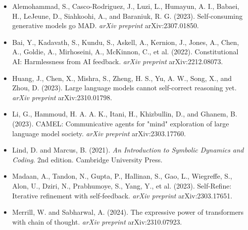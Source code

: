 \begin{itemize}
\item Alemohammad, S., Casco-Rodriguez, J., Luzi, L., Humayun, A. I., Babaei, H., LeJeune, D., Siahkoohi, A., and Baraniuk, R. G. (2023). Self-consuming generative models go MAD. \textit{arXiv preprint} arXiv:2307.01850.
\end{itemize}

\begin{itemize}
\item Bai, Y., Kadavath, S., Kundu, S., Askell, A., Kernion, J., Jones, A., Chen, A., Goldie, A., Mirhoseini, A., McKinnon, C., et al. (2022). Constitutional AI: Harmlessness from AI feedback. \textit{arXiv preprint} arXiv:2212.08073.
\end{itemize}

\begin{itemize}
\item Huang, J., Chen, X., Mishra, S., Zheng, H. S., Yu, A. W., Song, X., and Zhou, D. (2023). Large language models cannot self-correct reasoning yet. \textit{arXiv preprint} arXiv:2310.01798.
\end{itemize}

\begin{itemize}
\item Li, G., Hammoud, H. A. A. K., Itani, H., Khizbullin, D., and Ghanem, B. (2023). CAMEL: Communicative agents for "mind" exploration of large language model society. \textit{arXiv preprint} arXiv:2303.17760.
\end{itemize}

\begin{itemize}
\item Lind, D. and Marcus, B. (2021). \textit{An Introduction to Symbolic Dynamics and Coding}. 2nd edition. Cambridge University Press.
\end{itemize}

\begin{itemize}
\item Madaan, A., Tandon, N., Gupta, P., Hallinan, S., Gao, L., Wiegreffe, S., Alon, U., Dziri, N., Prabhumoye, S., Yang, Y., et al. (2023). Self-Refine: Iterative refinement with self-feedback. \textit{arXiv preprint} arXiv:2303.17651.
\end{itemize}

\begin{itemize}
\item Merrill, W. and Sabharwal, A. (2024). The expressive power of transformers with chain of thought. \textit{arXiv preprint} arXiv:2310.07923.
\end{itemize}

